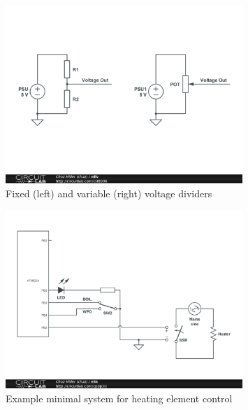 \documentclass[dvips,12pt]{article}
\begin{document}
\begin{figure}[h]
    \begin{centering}
    \includegraphics[width=0.8\textwidth]{vdiv}
    \caption{Fixed (left) and variable (right) voltage dividers}
    \label{fig:vdiv}
    \end{centering}
\end{figure}

\begin{figure}[h]
    \begin{centering}
    \includegraphics[width=0.8\textwidth]{min}
    \caption{Example minimal system for heating element control}
    \label{fig:min}
    \end{centering}
\end{figure}
\end{document}
